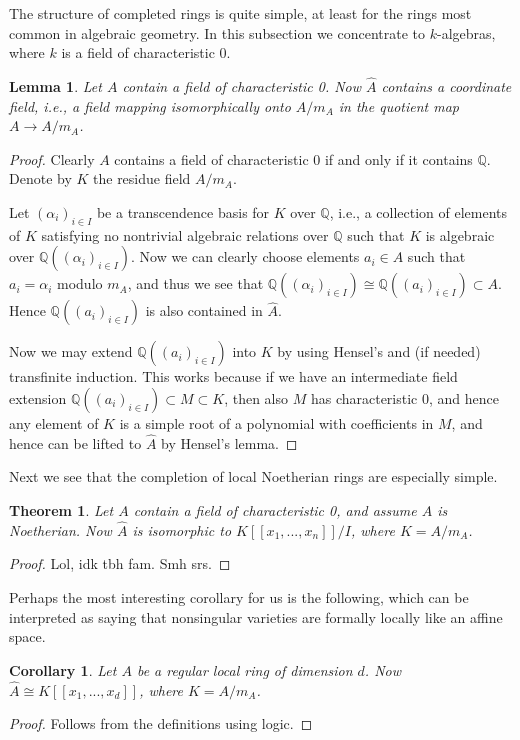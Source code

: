 \documentclass[12pt,a4paper,leqno]{article}
\newcommand{\Q}{\mathbb{Q}}
\theoremstyle{plain}
\newtheorem{thm}[theo]{Theorem}
\newtheorem{lem}[theo]{Lemma}
\newtheorem{cor}[theo]{Corollary}
\theoremstyle{definition}
\theoremstyle{remark}
\begin{document}
The structure of completed rings is quite simple, at least for the rings most common in algebraic geometry. In this subsection we concentrate to $k$-algebras, where $k$ is a field of characteristic 0.

\begin{lem}
Let $A$ contain a field of characteristic 0. Now $\hat A$ contains a coordinate field, i.e., a field mapping isomorphically onto $A/m_A$ in the quotient map $A \to A/m_A$.
\end{lem}
\begin{proof}
Clearly $A$ contains a field of characteristic 0 if and only if it contains $\Q$. Denote by $K$ the residue field $A/m_A$. 

Let $(\alpha_i)_{i \in I}$ be a transcendence basis for $K$ over $\Q$, i.e., a collection of elements of $K$ satisfying no nontrivial algebraic relations over $\Q$ such that $K$ is algebraic over $\Q((\alpha_i)_{i \in I})$. Now we can clearly choose elements $a_i \in A$ such that $a_i = \alpha_i$ modulo $m_A$, and thus we see that $\Q((\alpha_i)_{i \in I}) \cong \Q((a_i)_{i \in I}) \subset A$. Hence $\Q((a_i)_{i \in I})$ is also contained in $\hat A$.

Now we may extend $\Q((a_i)_{i \in I})$ into $K$ by using Hensel's and (if needed) transfinite induction. This works because if we have an intermediate field extension $\Q((a_i)_{i \in I}) \subset M \subset K$, then also $M$ has characteristic $0$, and hence any element of $K$ is a simple root of a polynomial with coefficients in $M$, and hence can be lifted to $\hat A$ by Hensel's lemma.
\end{proof}

Next we see that the completion of local Noetherian rings are especially simple.

\begin{thm}
Let $A$ contain a field of characteristic 0, and assume $A$ is Noetherian. Now $\hat A$ is isomorphic to $K[[x_1,...,x_n]]/I$, where $K = A/m_A$.
\end{thm}
\begin{proof}
Lol, idk tbh fam. Smh srs.
\end{proof}

Perhaps the most interesting corollary for us is the following, which can be interpreted as saying that nonsingular varieties are formally locally like an affine space.

\begin{cor}
Let $A$ be a regular local ring of dimension $d$. Now $\hat A \cong K[[x_1,...,x_d]]$, where $K = A/m_A$.
\end{cor}
\begin{proof}
Follows from the definitions using logic.
\end{proof}
\end{document}

